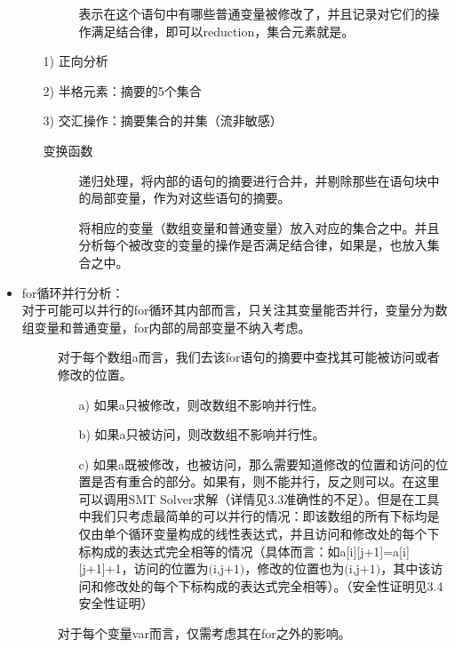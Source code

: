 \documentclass[12pt]{article}
\begin{document}
\begin{itemize}
\begin{itemize}
\begin{description}
								表示在这个语句中有哪些普通变量被修改了，并且记录对它们的操作满足结合律，即可以reduction，集合元素就是。
						\end{description}
					\item[1)] 正向分析
					\item[2)] 半格元素：摘要的5个集合
					\item[3)] 交汇操作：摘要集合的并集（流非敏感）
					\begin{item}[4)] 
						变换函数\\
						\begin{description}
							\item[] 递归处理，将内部的语句的摘要进行合并，并剔除那些在语句块中的局部变量，作为对这些语句的摘要。
							\item[]	 将相应的变量（数组变量和普通变量）放入对应的集合之中。并且分析每个被改变的变量的操作是否满足结合律，如果是，也放入集合之中。
						\end{description}
					\end{item}
				\end{itemize}
				\item for循环并行分析：\\
					对于可能可以并行的for循环其内部而言，只关注其变量能否并行，变量分为数组变量和普通变量，for内部的局部变量不纳入考虑。
					\begin{description}
						\item[] 对于每个数组a而言，我们去该for语句的摘要中查找其可能被访问或者修改的位置。\\
							\begin{itemize}
								\item[a)] 如果a只被修改，则改数组不影响并行性。
								\item[b)] 如果a只被访问，则改数组不影响并行性。
								\item[c)] 如果a既被修改，也被访问，那么需要知道修改的位置和访问的位置是否有重合的部分。如果有，则不能并行，反之则可以。在这里可以调用SMT Solver求解（详情见3.3准确性的不足）。但是在工具中我们只考虑最简单的可以并行的情况：即该数组的所有下标均是仅由单个循环变量构成的线性表达式，并且访问和修改处的每个下标构成的表达式完全相等的情况（具体而言：如a[i][j+1]=a[i][j+1]+1，访问的位置为$\text{(i,j+1)}$，修改的位置也为$\text{(i,j+1)}$，其中该访问和修改处的每个下标构成的表达式完全相等）。（安全性证明见3.4安全性证明）
							\end{itemize}
						\item[]	 对于每个变量var而言，仅需考虑其在for之外的影响。\\

\end{description}
\end{itemize}
\end{document}
